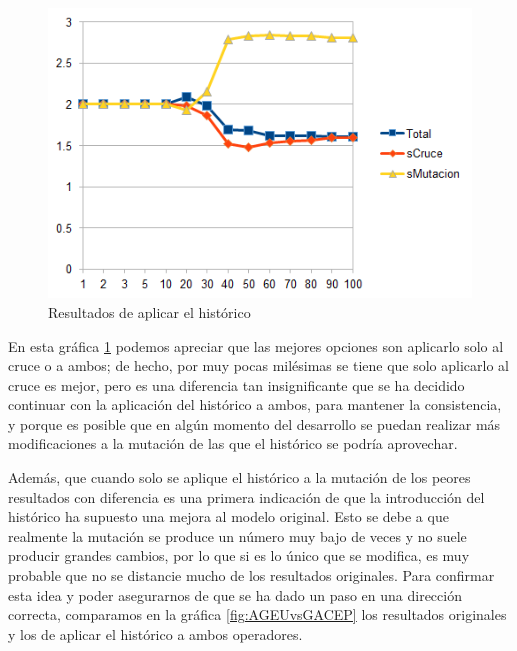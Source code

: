 \begin{figure}[H]
		\centering
		\includegraphics[scale=0.8]{imagenes/Experimental/Historico.png}
        \caption{Resultados de aplicar el histórico}
        \label{fig:Historico}
\end{figure}

En esta gráfica \ref{fig:Historico} podemos apreciar que las mejores opciones son aplicarlo solo al cruce o a ambos; de hecho, por muy pocas milésimas se tiene que solo aplicarlo al cruce es mejor, pero es una diferencia tan insignificante que se ha decidido continuar con la aplicación del histórico a ambos, para mantener la consistencia, y porque es posible que en algún momento del desarrollo se puedan realizar más modificaciones a la mutación de las que el histórico se podría aprovechar. 

Además, que cuando solo se aplique el histórico a la mutación de los peores resultados con diferencia es una primera indicación de que la introducción del histórico ha supuesto una mejora al modelo original.
Esto se debe a que realmente la mutación se produce un número muy bajo de veces y no suele producir grandes cambios, por lo que si es lo único que se modifica, es muy probable que no se distancie mucho de los resultados originales. 
Para confirmar esta idea y poder asegurarnos de que se ha dado un paso en una dirección correcta, comparamos en la gráfica \ref{fig:AGEUvsGACEP} los resultados originales y los de aplicar el histórico a ambos operadores. 

